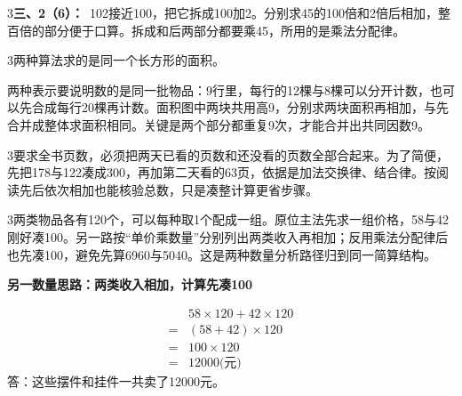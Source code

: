 \documentclass[multi=snippet,border={5bp 20bp 5bp 5bp}]{standalone}
\newenvironment{snippet}[3]{\begin{minipage}{#1bp}\color{answerred}\fontsize{#2}{#3}\selectfont\raggedright}{\end{minipage}}
\begin{document}
\begin{snippet}{505}{11.5}{14}\begin{multicols}{3}\raggedcolumns \textbf{三、2（6）：}\ 102接近100，把它拆成100加2。分别求45的100倍和2倍后相加，整百倍的部分便于口算。拆成和后两部分都要乘45，所用的是乘法分配律。\end{multicols}\end{snippet}
\begin{snippet}{505}{11.5}{14}\begin{multicols}{3}\raggedcolumns 两种算法求的是同一个长方形的面积。\par 两种表示要说明数的是同一批物品：9行里，每行的12棵与8棵可以分开计数，也可以先合成每行20棵再计数。面积图中两块共用高9，分别求两块面积再相加，与先合并成整体求面积相同。关键是两个部分都重复9次，才能合并出共同因数9。\end{multicols}\end{snippet}
\begin{snippet}{505}{11.5}{14}\begin{multicols}{3}\raggedcolumns 要求全书页数，必须把两天已看的页数和还没看的页数全部合起来。为了简便，先把178与122凑成300，再加第二天看的63页，依据是加法交换律、结合律。按阅读先后依次相加也能核验总数，只是凑整计算更省步骤。\end{multicols}\end{snippet}
\begin{snippet}{505}{11.5}{14}\begin{multicols}{3}\raggedcolumns 两类物品各有120个，可以每种取1个配成一组。原位主法先求一组价格，58与42刚好凑100。另一路按“单价乘数量”分别列出两类收入再相加；反用乘法分配律后也先凑100，避免先算6960与5040。这是两种数量分析路径归到同一简算结构。\par \textbf{另一数量思路：两类收入相加，计算先凑100}\par \[\begin{aligned}&58\times120+42\times120\\={}&(58+42)\times120\\={}&100\times120\\={}&12000\text{(元)}\end{aligned}\]答：这些摆件和挂件一共卖了12000元。\end{multicols}\end{snippet}
\end{document}

